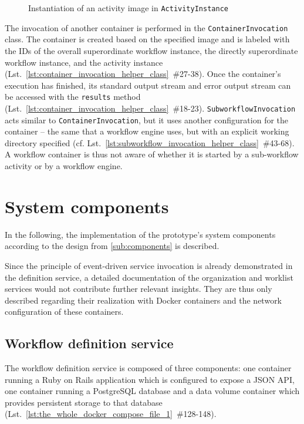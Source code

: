     \begin{figure}[htbp]
      \inputminted[firstline=18,lastline=27,fontsize=\footnotesize,linenos=true,numberblanklines=true,showspaces=false,breaklines=true,baselinestretch=1,gobble=2]{ruby}{../code/ac_base/run.rb}
      \caption[]{Instantiation of an activity image in \texttt{ActivityInstance}}
      \label{fig:main_logic_of_ac_instance}
    \end{figure}

    The invocation of another container is performed in the \texttt{ContainerInvocation} class. The container is created based on the specified image and is labeled with the \acp{ID} of the overall superordinate workflow instance, the directly superordinate workflow instance, and the activity instance (Lst.~\ref{lst:container_invocation_helper_class}~\#27-38).
    Once the container's execution has finished, its standard output stream and error output stream can be accessed with the \texttt{results} method (Lst.~\ref{lst:container_invocation_helper_class}~\#18-23). \texttt{SubworkflowInvocation} acts similar to \texttt{ContainerInvocation}, but it uses another configuration for the container -- the same that a workflow engine uses, but with an explicit working directory specified (cf. Lst.~\ref{lst:subworkflow_invocation_helper_class}~\#43-68). A workflow container is thus not aware of whether it is started by a sub-workflow activity or by a workflow engine.


\section{System components} %
\label{sec:components_implementation}
    In the following, the implementation of the prototype's system components according to the design from  \ref{sub:components} is described.

    Since the principle of event-driven service invocation is already demonstrated in the definition service, a detailed documentation of the organization and worklist services would not contribute further relevant insights. They are thus only described regarding their realization with Docker containers and the network configuration of these containers.

  \subsection{Workflow definition service} %
    \label{sub:workflow_definition_service}
    The workflow definition service is composed of three components: one container running a Ruby on Rails application which is configured to expose a JSON API, one container running a PostgreSQL database and a data volume container which provides persistent storage to that database (Lst.~\ref{lst:the_whole_docker_compose_file_1}~\#128-148).

